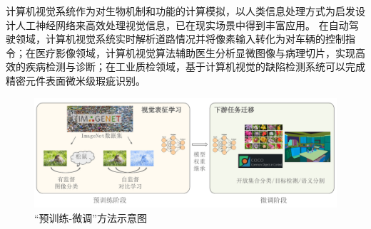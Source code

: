 

计算机视觉系统作为对生物机制和功能的计算模拟，以人类信息处理方式为启发设计人工神经网络来高效处理视觉信息，已在现实场景中得到丰富应用。
在自动驾驶领域，计算机视觉系统实时解析道路情况并将像素输入转化为对车辆的控制指令；在医疗影像领域，计算机视觉算法辅助医生分析显微图像与病理切片，实现高效的疾病检测与诊断；在工业质检领域，基于计算机视觉的缺陷检测系统可以完成精密元件表面微米级瑕疵识别。

\begin{figure}
  \centering
  \includegraphics[width=1.0\linewidth]{figures/论文-图1-预训练-微调-v2.pdf}
  \caption{“预训练-微调”方法示意图}
  \label{fig:1-pt-ft-example}
\end{figure}

